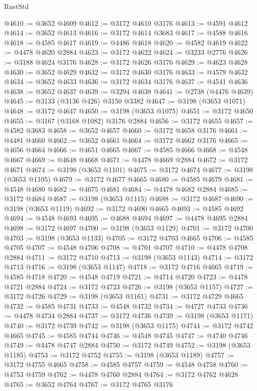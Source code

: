 \begin{lexlean}{RustStd}
\begin{coremodule}
@4610 := @3652 @4609
@4612 := @3172 @4610 @3176
@4613 := @4591 @4612
@4614 := @3652 @4613
@4616 := @3172 @4614 @3683
@4617 := @4588 @4616
@4618 := @4585 @4617
@4619 := @4486 @4618
@4620 := @4582 @4619
@4622 := @4478 @4620 @2884
@4623 := @3172 @4622
@4624 := @3233 @2776
@4626 := @3188 @4624 @3176
@4628 := @3172 @4626 @3176
@4629 := @4623 @4628
@4630 := @3652 @4629
@4632 := @3172 @4630 @3176
@4633 := @4579 @4632
@4634 := @3652 @4633
@4636 := @3172 @4634 @3176
@4637 := @4541 @4636
@4638 := @3652 @4637
@4639 := @3294 @4638
@4641 := @2738 (@4476 @4639)
@4645 := @3133 (@3136 @426) @3150 @3382
@4647 := @3198 (@3653 @1071)
@4648 := @3172 @4647
@4650 := @3198 (@3653 @1075)
@4651 := @3172 @4650
@4655 := @3167 (@3168 @1082) @3176 @2884
@4656 := @3172 @4655
@4657 := @4582 @3683
@4658 := @3652 @4657
@4660 := @3172 @4658 @3176
@4661 := @4481 @4660
@4662 := @3652 @4661
@4664 := @3172 @4662 @3176
@4665 := @4656 @4664
@4666 := @4651 @4665
@4667 := @4585 @4666
@4668 := @4548 @4667
@4669 := @4648 @4668
@4671 := @4478 @4669 @2884
@4672 := @3172 @4671
@4674 := @3198 (@3653 @1101)
@4675 := @3172 @4674
@4677 := @3198 (@3653 @1105)
@4679 := @3172 @4677 @4665
@4680 := @4585 @4679
@4681 := @4548 @4680
@4682 := @4675 @4681
@4684 := @4478 @4682 @2884
@4685 := @3172 @4684
@4687 := @3198 (@3653 @1115)
@4688 := @3172 @4687
@4690 := @3198 (@3653 @1119)
@4692 := @3172 @4690 @4665
@4693 := @4585 @4692
@4694 := @4548 @4693
@4695 := @4688 @4694
@4697 := @4478 @4695 @2884
@4698 := @3172 @4697
@4700 := @3198 (@3653 @1129)
@4701 := @3172 @4700
@4703 := @3198 (@3653 @1133)
@4705 := @3172 @4703 @4665
@4706 := @4585 @4705
@4707 := @4548 @4706
@4708 := @4701 @4707
@4710 := @4478 @4708 @2884
@4711 := @3172 @4710
@4713 := @3198 (@3653 @1143)
@4714 := @3172 @4713
@4716 := @3198 (@3653 @1147)
@4718 := @3172 @4716 @4665
@4719 := @4585 @4718
@4720 := @4548 @4719
@4721 := @4714 @4720
@4723 := @4478 @4721 @2884
@4724 := @3172 @4723
@4726 := @3198 (@3653 @1157)
@4727 := @3172 @4726
@4729 := @3198 (@3653 @1161)
@4731 := @3172 @4729 @4665
@4732 := @4585 @4731
@4733 := @4548 @4732
@4734 := @4727 @4733
@4736 := @4478 @4734 @2884
@4737 := @3172 @4736
@4739 := @3198 (@3653 @1171)
@4740 := @3172 @4739
@4742 := @3198 (@3653 @1175)
@4744 := @3172 @4742 @4665
@4745 := @4585 @4744
@4746 := @4548 @4745
@4747 := @4740 @4746
@4749 := @4478 @4747 @2884
@4750 := @3172 @4749
@4752 := @3198 (@3653 @1185)
@4753 := @3172 @4752
@4755 := @3198 (@3653 @1189)
@4757 := @3172 @4755 @4665
@4758 := @4585 @4757
@4759 := @4548 @4758
@4760 := @4753 @4759
@4762 := @4478 @4760 @2884
@4764 := @3172 @4762 @4628
@4765 := @3652 @4764
@4767 := @3172 @4765 @3176

\end{coremodule}
\end{lexlean}
